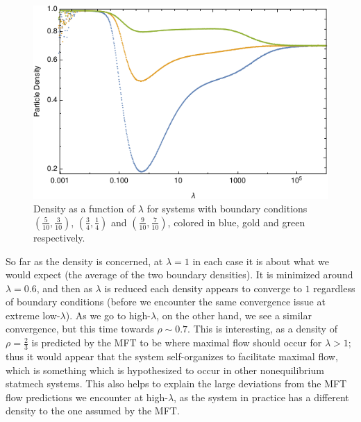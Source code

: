 \documentclass[
reprint,
 amsmath,amssymb,
 aps,
 prl,
]{revtex4-1}
\begin{document}
\begin{figure}[h!]
\vspace{1em}
\caption{\label{fig:largeDensity} Density as a function of $\lambda$ for systems with boundary conditions $(\frac{5}{10}, \frac{3}{10})$, $(\frac{3}{4}, \frac{1}{4})$ and $(\frac{9}{10}, \frac{7}{10})$, colored in blue, gold and green
respectively.}
    \includegraphics[width=0.95\linewidth]{images/largeRangeDensity}
    \vspace{0em}
\end{figure}
So far as the density is concerned, at $\lambda=1$ in each case it is about what we would expect (the average of the two boundary densities). It is minimized around $\lambda = 0.6$, and then as $\lambda$ is reduced each density appears to 
converge to $1$ regardless of boundary conditions (before we encounter the same convergence issue at extreme low-$\lambda$). As we go to high-$\lambda$, on the other hand, we see a similar convergence, but this time towards $\rho \sim 0.7$.
This is interesting, as a density of $\rho=\frac{2}{3}$ is predicted by the MFT to be where maximal flow should occur for $\lambda>1$; thus it would appear that the system self-organizes to facilitate maximal flow, which is something which
is hypothesized to occur in other nonequilibrium statmech systems. This also helps to explain the large deviations from the MFT flow predictions we encounter at high-$\lambda$, as the system in practice has a different density to the one assumed
by the MFT.
\end{document}
